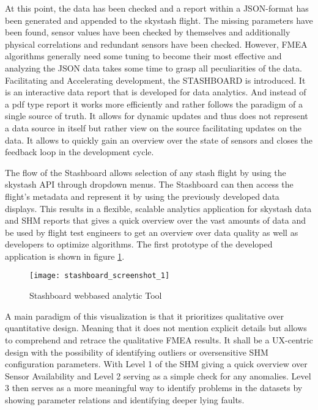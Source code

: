 At this point, the data has been checked and a report within a JSON-format has been generated and appended to the skystash flight. The missing parameters have been found, sensor values have been checked by themselves and additionally physical correlations and redundant sensors have been checked. However, FMEA algorithms generally need some tuning to become their most effective and analyzing the JSON data takes some time to grasp all peculiarities of the data. Facilitating and Accelerating development, the STASHBOARD is introduced. It is an interactive data report that is developed for data analytics. And instead of a pdf type report it works more efficiently and rather follows the paradigm of a single source of truth. It allows for dynamic updates and thus does not represent a data source in itself but rather view on the source facilitating updates on the data. It allows to quickly gain an overview over the state of sensors and closes the feedback loop in the development cycle.

The flow of the Stashboard allows selection of any stash flight by using the skystash API through dropdown menus. The Stashboard can then access the flight's metadata and represent it by using the previously developed data displays.
This results in a flexible, scalable analytics application for skystash data and SHM reports that gives a quick overview over the vast amounts of data and be used by flight test engineers to get an overview over data quality as well as developers to optimize algorithms. The first prototype of the developed application is shown in figure \ref{fig:stashboard}.

\begin{figure}[!h]
    \centering
    \texttt{[image: stashboard\_screenshot\_1]}
    \caption{Stashboard webbased analytic Tool }
    \label{fig:stashboard}
\end{figure}
A main paradigm of this visualization is that it prioritizes qualitative over quantitative design. Meaning that it does not mention explicit details but allows to comprehend and retrace the qualitative FMEA results. It shall be a UX-centric design with the possibility of identifying outliers or oversensitive SHM configuration parameters. With Level 1 of the SHM giving a quick overview over Sensor Availability and Level 2 serving as a simple check for any anomalies. Level 3 then serves as a more meaningful way to identify problems in the datasets by showing parameter relations and identifying deeper lying faults.

